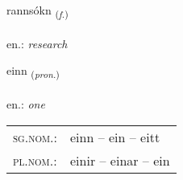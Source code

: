\documentclass[frontgrid, backgrid]{flacards}\usepackage[]{graphicx}\usepackage[]{xcolor}
\begin{document}
\renewcommand{\blhead}{\vskip5pt {\small\bfseries\footnotesize Nafnorð | Noun }}
\renewcommand{\bcfoot}{\vskip5pt \hspace{2pt}{\small\bfseries\footnotesize 1K}}


{rannsókn \small{\textsubscript{(\textit{f.})}} \\[1ex] %
\textphonetic{[ransouhkn̥]} \\
en.: \emph{research} \\  [2ex]
\renewcommand*{\arraystretch}{0.8}
}

\renewcommand{\flhead}{\vskip5pt \fboxsep=0pt {\small\bfseries\footnotesize Fornafn | Pronoun}}
\renewcommand{\fcfoot}{\vskip5pt \fboxsep=0pt \hspace{2pt}{\small\bfseries\footnotesize 1K}}

\renewcommand{\blhead}{\vskip5pt {\small\bfseries\footnotesize Fornafn | Pronoun }}
\renewcommand{\bcfoot}{\vskip5pt \hspace{2pt}{\small\bfseries\footnotesize 1K}}


{einn \small{\textsubscript{(\textit{pron.})}} \\[1ex] %
\textphonetic{[eitn̥]} \\
en.: \emph{one} \\  [2ex]
\renewcommand*{\arraystretch}{0.8}
\begin{tabular}{ll}
\textsc{sg.nom.}: & einn  --  ein -- eitt \\ 
\textsc{pl.nom.}: & einir -- einar -- ein
\end{tabular}
}

\renewcommand{\flhead}{\vskip5pt \fboxsep=0pt {\small\bfseries\footnotesize Lýsingarorð | Adjective}}
\renewcommand{\fcfoot}{\vskip5pt \fboxsep=0pt \hspace{2pt}{\small\bfseries\footnotesize 1K}}
\end{document}
